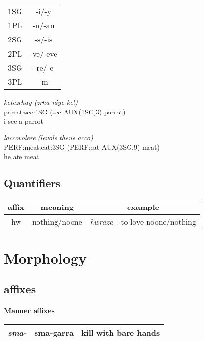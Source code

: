 \documentclass[11pt]{article}
\begin{document}
\begin{tabular}{c | c}
  1SG & -i/-y \\
  1PL & -n/-an \\
  2SG & -s/-is \\
  2PL & -ve/-eve \\
  3SG & -re/-e \\
  3PL & -m \\
\end{tabular}

\begin{exe}
\ex 
\gll \textit{ketezrhay (zrha niye ket)} \\
  parrot:see:1SG (see AUX(1SG,3) parrot) \\
\trans i see a parrot

\ex 
\gll \textit{laccovolere (levole theue acco)} \\
  PERF:meat:eat:3SG (PERF:eat AUX(3SG,9) meat) \\
\trans he ate meat
\end{exe}

\subsection{Quantifiers}

\begin{center}
\begin{tabular}{c | c | c}
affix & meaning & example \\ \hline
hw & nothing/noone & \textit{hwraza} - to love noone/nothing \\
\end{tabular}
\end{center}


\section{Morphology}
\subsection{affixes}
\paragraph{Manner affixes}
\begin{center}
\begin{tabular}{| c | c | c |}
  \hline
  \textit{sma-} & sma-garra & kill with bare hands \\ \hline
\end{tabular}
\end{center}
\end{document}
